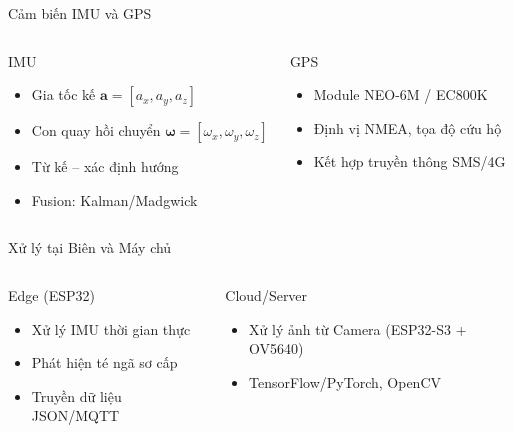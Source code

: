 \begin{frame}{Cảm biến IMU và GPS}
\begin{columns}
\begin{block}{IMU}
\begin{itemize}
\item Gia tốc kế $\mathbf{a}=[a_x,a_y,a_z]$
\item Con quay hồi chuyển $\boldsymbol{\omega}=[\omega_x,\omega_y,\omega_z]$
\item Từ kế – xác định hướng
\item Fusion: Kalman/Madgwick
\end{itemize}
\end{block}

\begin{exampleblock}{GPS}
\begin{itemize}
\item Module NEO-6M / EC800K
\item Định vị NMEA, tọa độ cứu hộ
\item Kết hợp truyền thông SMS/4G
\end{itemize}
\end{exampleblock}
\end{columns}
\end{frame}


\begin{frame}{Xử lý tại Biên và Máy chủ }
\begin{columns}
\begin{block}{Edge (ESP32)}
\begin{itemize}
\item Xử lý IMU thời gian thực
\item Phát hiện té ngã sơ cấp
\item Truyền dữ liệu JSON/MQTT
\end{itemize}
\end{block}

\begin{block}{Cloud/Server}
\begin{itemize}
\item Xử lý ảnh từ Camera (ESP32-S3 + OV5640)
\item TensorFlow/PyTorch, OpenCV
\end{itemize}
\end{block}
\end{columns}
\end{frame}

